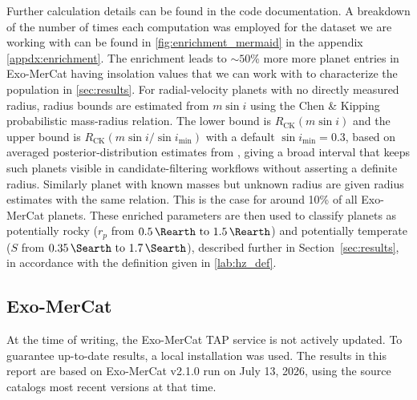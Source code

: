 Further calculation details can be found in the code documentation. A breakdown of the number of times each computation was employed for the dataset we are working with can be found in \cref{fig:enrichment_mermaid} in the appendix \cref{appdx:enrichment}. The enrichment leads to $\sim50$\% more more planet entries in Exo-MerCat having insolation values that we can work with to characterize the population in \cref{sec:results}. 
For radial-velocity planets with no directly measured radius, radius bounds are estimated from $m\sin i$ using the Chen \& Kipping \citeyear{ChenKipping2017} probabilistic mass-radius relation. The lower bound is $R_\mathrm{CK}(m\sin i)$ and the upper bound is $R_\mathrm{CK}(m\sin i 
/ \sin i_\mathrm{min})$ with a default $\sin i_\mathrm{min} = 0.3$, based on averaged posterior-distribution estimates from \textcite{HoTurner2011}, giving a broad interval that keeps such planets visible in candidate-filtering workflows without asserting a definite radius. Similarly planet with known masses but unknown radius are given radius estimates with the same relation. This is the case for around 10\% of all Exo-MerCat planets.
These enriched parameters are then used to classify planets as potentially rocky ($r_p$ from $\qtyrange{0.5}{1.5}{\Rearth}$) and potentially temperate ($S$ from $\qtyrange{0.35}{1.7}{\Searth}$), described further in Section~\ref{sec:results}, in accordance with the definition given in \cref{lab:hz_def}.
\subsection{Exo-MerCat}
At the time of writing, the Exo-MerCat \cite{Alei_2020, Alei_2025} TAP service is not actively updated. To guarantee up-to-date results, a local installation was used. The results in this report are based on Exo-MerCat v2.1.0 run on July 13, 2026, using the source catalogs most recent versions at that time.
